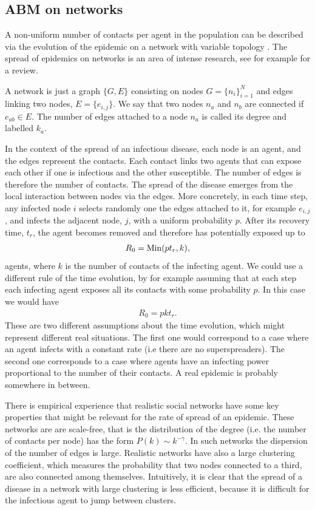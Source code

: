 \documentclass[a4paper,oneside,11pt]{article}
\begin{document}
\subsection{ABM on networks}

A non-uniform number of contacts per agent in the population can be described via the evolution of the epidemic on a network with variable topology \cite{Albert_2002}. The spread of epidemics on networks is an area of intense research, see for example \cite{Pastor_Satorras_2015}
for a review.

A network is just a graph \(\{G,E\}\)
consisting on
nodes \(G=\{n_i\}_{i=1}^N\) and edges linking two nodes, \(E=\{e_{i,j}\}\). We say that
two nodes \(n_a\) and \(n_b\) are connected if \(e_{ab}\in E\). The number
of edges attached to a node \(n_a\) is called its degree and labelled
\(k_a\).

In the context of the spread of an infectious disease, each node is
an agent, and the edges represent the contacts. Each contact links two agents that can expose each other if one is infectious and the other susceptible. The number of edges is therefore the number of contacts. The spread of the disease emerges from the local interaction between nodes via the edges. More concretely, in each time step, any infected node $i$ selects randomly one the edges attached to it, for example $e_{i,j}$, and infects the adjacent node, $j$, with a uniform probability $p$.
After its recovery time, $t_r$, the agent becomes removed and therefore has potentially exposed up to  
\begin{eqnarray}
R_0 = {\rm Min}(p t_r, k),
\end{eqnarray}
agents, where $k$ is the number of contacts of the infecting agent. 
 We could use a different rule of the time evolution, by for example assuming that at each step each infecting agent exposes all its contacts with some probability $p$. In this case we would have
 \begin{eqnarray}
 R_0= p k t_r. 
 \end{eqnarray}
These are two different assumptions about the time evolution, which might represent different real situations. The first one would correspond to a case where an agent infects with a constant rate (i.e there are no superspreaders). The second one corresponds to a case where agents have an infecting power proportional to the number of their contacts. A real epidemic is probably somewhere in between.

 There is empirical experience that realistic social networks have some key properties that might be relevant for the rate of spread of an epidemic.  These networks are are scale-free, that is the distribution of the degree (i.e. the number of contacts per node) has the form \(P(k)\sim k^{-\gamma}\). In such networks the dispersion of the number of edges is large. Realistic networks have also a large clustering coefficient, which measures the probability that two nodes connected to a third, are also connected among themselves. Intuitively, it is clear that the spread of a disease in a network with large clustering is less efficient, because it is difficult for the infectious agent to jump between clusters.
\end{document}
